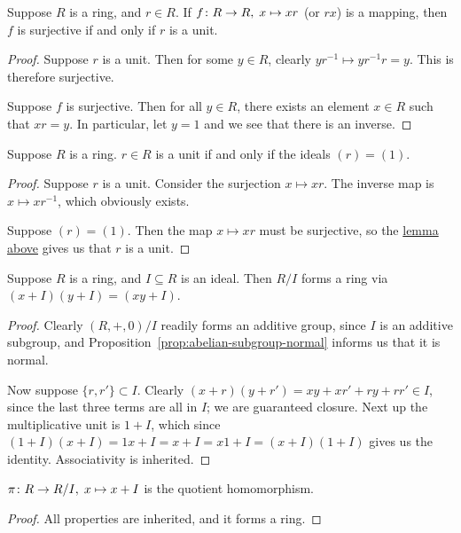 \begin{lemma}\label{lem:unit-mult-surjective}
    Suppose \(R\) is a ring, and \(r \in R\).
    If \(f\colon R\to R,\;x\mapsto xr\) (or \(rx\)) is a mapping,
    then \(f\) is surjective if and only if \(r\) is a unit.
\end{lemma}
\begin{proof}
    Suppose \(r\) is a unit.
    Then for some \(y \in R\),
    clearly \(yr^{-1} \mapsto yr^{-1}r = y\).
    This is therefore surjective.

    Suppose \(f\) is surjective.
    Then for all \(y \in R\),
    there exists an element \(x \in R\) such that \(xr = y\).
    In particular, let \(y = 1\) and we see that there is an inverse.
\end{proof}
\begin{proposition}\label{prop:unit-one-ideal}
    Suppose \(R\) is a ring.
    \(r \in R\) is a unit if and only if the ideals \((r) = (1)\).
\end{proposition}
\begin{proof}
    Suppose \(r\) is a unit.
    Consider the surjection \(x \mapsto xr\).
    The inverse map is \(x \mapsto xr^{-1}\), which obviously exists.

    Suppose \((r) = (1)\).
    Then the map \(x \mapsto xr\) must be surjective,
    so the \hyperref[lem:unit-mult-surjective]{lemma above} gives us that \(r\) is a unit.
\end{proof}

\begin{lemma}
    Suppose \(R\) is a ring, and \(I \subseteq R\) is an ideal.
    Then \(R/I\) forms a ring via \((x+I)(y+I) = (xy+I)\).
\end{lemma}
\begin{proof}
    Clearly \((R,+,0)/I\) readily forms an additive group,
    since \(I\) is an additive subgroup,
    and Proposition~\ref{prop:abelian-subgroup-normal}
    informs us that it is normal.

    Now suppose \(\{r,r'\} \subset I\).
    Clearly \((x+r)(y+r') = xy + xr' + ry + rr' \in I\),
    since the last three terms are all in \(I\);
    we are guaranteed closure.
    Next up the multiplicative unit is \(1+I\),
    which since \((1+I)(x+I) = 1x+I = x+I = x1+I = (x+I)(1+I)\)
    gives us the identity.
    Associativity is inherited.
\end{proof}
\begin{corollary}
    \(\pi\colon R\to R/I,\;x\mapsto x+I\) is the quotient homomorphism.
\end{corollary}
\begin{proof}
    All properties are inherited, and it forms a ring.
\end{proof}

